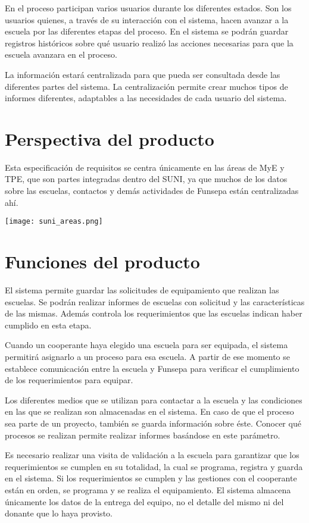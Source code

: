 \documentclass[11pt]{report}
\begin{document}
	En el proceso participan varios usuarios durante los diferentes estados. Son los usuarios quienes, a través de su interacción con el sistema, hacen avanzar a la escuela por las diferentes etapas del proceso. En el sistema se podrán guardar registros históricos sobre qué usuario realizó las acciones necesarias para que la escuela avanzara en el proceso.
	
	La información estará centralizada para que pueda ser consultada desde las diferentes partes del sistema. La centralización permite crear muchos tipos de informes diferentes, adaptables a las necesidades de cada usuario del sistema.
	
	\section{Perspectiva del producto}
	Esta especificación de requisitos se centra únicamente en las áreas de MyE y TPE, que son partes integradas dentro del SUNI, ya que muchos de los datos sobre las escuelas, contactos y demás actividades de Funsepa están centralizadas ahí.
	
	\begin{center}
		\texttt{[image: suni\_areas.png]}
	\end{center}
	
	
	\section{Funciones del producto}
	El sistema permite guardar las solicitudes de equipamiento que realizan las escuelas. Se podrán realizar informes de escuelas con solicitud y las características de las mismas. Además controla los requerimientos que las escuelas indican haber cumplido en esta etapa.
	
	Cuando un cooperante haya elegido una escuela para ser equipada, el sistema permitirá asignarlo a un proceso para esa escuela. A partir de ese momento se establece comunicación entre la escuela y Funsepa para verificar el cumplimiento de los requerimientos para equipar.
	
	Los diferentes medios que se utilizan para contactar a la escuela y las condiciones en las que se realizan son almacenadas en el sistema. En caso de que el proceso sea parte de un proyecto, también se guarda información sobre éste. Conocer qué procesos se realizan permite realizar informes basándose en este parámetro.
	
	Es necesario realizar una visita de validación a la escuela para garantizar que los requerimientos se cumplen en su totalidad, la cual se programa, registra y guarda en el sistema. Si los requerimientos se cumplen y las gestiones con el cooperante están en orden, se programa y se realiza el equipamiento. 
	El sistema almacena únicamente los datos de la entrega del equipo, no el detalle del mismo ni del donante que lo haya provisto.
	
\end{document}
